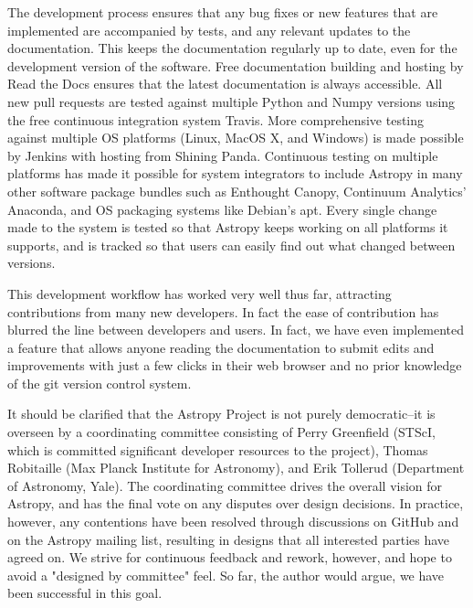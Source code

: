 \documentclass[11pt,twoside]{article}
\begin{document}
The development process ensures that any bug fixes or new features that are
implemented are accompanied by tests, and any relevant updates to the
documentation.  This keeps the documentation regularly up to date, even for the
development version of the software.  Free documentation building and hosting
by Read the Docs ensures that the latest documentation is always accessible.
All new pull requests are tested against multiple Python and Numpy versions
using the free continuous integration system Travis.  More comprehensive
testing against multiple OS platforms (Linux, MacOS X, and Windows) is made
possible by Jenkins with hosting from Shining Panda.  Continuous testing on
multiple platforms has made it possible for system integrators to include
Astropy in many other software package bundles such as Enthought Canopy,
Continuum Analytics' Anaconda, and OS packaging systems like Debian's apt.
Every single change made to the system is tested so that Astropy keeps working
on all platforms it supports, and is tracked so that users can easily find out
what changed between versions.

This development workflow has worked very well thus far, attracting
contributions from many new developers.  In fact the ease of contribution has
blurred the line between developers and users.  In fact, we have even
implemented a feature that allows anyone reading the documentation to submit
edits and improvements with just a few clicks in their web browser and no
prior knowledge of the git version control system.

It should be clarified that the Astropy Project is not purely democratic--it is
overseen by a coordinating committee consisting of Perry Greenfield (STScI,
which is committed significant developer resources to the project), Thomas
Robitaille (Max Planck Institute for Astronomy), and Erik Tollerud (Department
of Astronomy, Yale).  The coordinating committee drives the overall vision for
Astropy, and has the final vote on any disputes over design decisions.  In
practice, however, any contentions have been resolved through discussions on
GitHub and on the Astropy mailing list, resulting in designs that all
interested parties have agreed on.  We strive for continuous feedback and
rework, however, and hope to avoid a "designed by committee" feel.  So far, the
author would argue, we have been successful in this goal.


\end{document}
